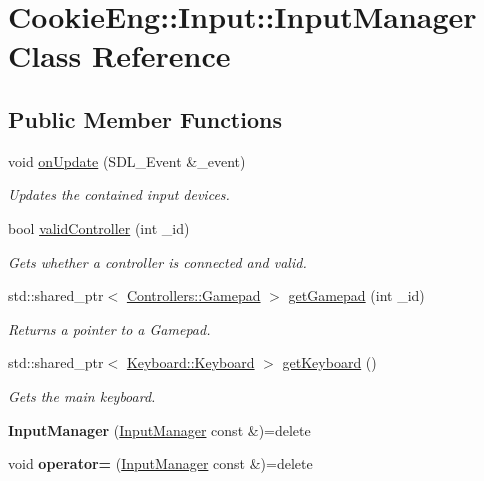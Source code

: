 \hypertarget{class_cookie_eng_1_1_input_1_1_input_manager}{}\section{Cookie\+Eng\+:\+:Input\+:\+:Input\+Manager Class Reference}
\label{class_cookie_eng_1_1_input_1_1_input_manager}
\subsection*{Public Member Functions}
\begin{DoxyCompactItemize}
\item 
void \hyperlink{class_cookie_eng_1_1_input_1_1_input_manager_ab76d5635bce758f681129ea0cd4afb36}{on\+Update} (S\+D\+L\+\_\+\+Event \&\+\_\+event)
\begin{DoxyCompactList}\small\item\em Updates the contained input devices. \end{DoxyCompactList}\item 
bool \hyperlink{class_cookie_eng_1_1_input_1_1_input_manager_aec78aafcc64f05a3e4eb094e7bb690a6}{valid\+Controller} (int \+\_\+id)
\begin{DoxyCompactList}\small\item\em Gets whether a controller is connected and valid. \end{DoxyCompactList}\item 
std\+::shared\+\_\+ptr$<$ \hyperlink{class_cookie_eng_1_1_input_1_1_controllers_1_1_gamepad}{Controllers\+::\+Gamepad} $>$ \hyperlink{class_cookie_eng_1_1_input_1_1_input_manager_a0a5ffdaf3c5293f4c18f3808e46f5369}{get\+Gamepad} (int \+\_\+id)
\begin{DoxyCompactList}\small\item\em Returns a pointer to a Gamepad. \end{DoxyCompactList}\item 
std\+::shared\+\_\+ptr$<$ \hyperlink{class_cookie_eng_1_1_input_1_1_keyboard_1_1_keyboard}{Keyboard\+::\+Keyboard} $>$ \hyperlink{class_cookie_eng_1_1_input_1_1_input_manager_afc8c29f4a07a98ea6599e5f421115361}{get\+Keyboard} ()
\begin{DoxyCompactList}\small\item\em Gets the main keyboard. \end{DoxyCompactList}\item 
\mbox{\label{class_cookie_eng_1_1_input_1_1_input_manager_acd6ce668320f6c5b26e49dee84124ef3}} 
{\bfseries Input\+Manager} (\hyperlink{class_cookie_eng_1_1_input_1_1_input_manager}{Input\+Manager} const \&)=delete
\item 
\mbox{\label{class_cookie_eng_1_1_input_1_1_input_manager_abb6e65e5f51871ef3811ef0b709c5e5b}} 
void {\bfseries operator=} (\hyperlink{class_cookie_eng_1_1_input_1_1_input_manager}{Input\+Manager} const \&)=delete
\end{DoxyCompactItemize}
